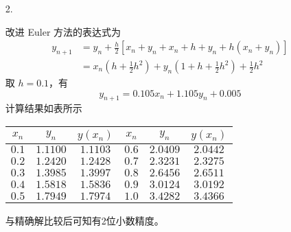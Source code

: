 \documentclass{sjtuarticle}
\begin{document}
\begin{itemize}
    \item[2.] \begin{solution}
        改进 Euler 方法的表达式为
        \begin{equation*}
            \begin{aligned}
            y_{n+1}&=y_n + \frac{h}{2}[x_n+y_n+x_n+h+y_n+h(x_n+y_n)]\\
                    &=x_n\left(h+\frac{1}{2}h^2\right) + y_n\left(1+h+\frac{1}{2}h^2\right) + \frac{1}{2}h^2
            \end{aligned}
        \end{equation*}
        取 $h=0.1$，有
        \begin{equation*}
            y_{n+1}=0.105x_n+1.105y_n+0.005
        \end{equation*}
        计算结果如表所示
        \begin{table}[h]
            \centering
            \begin{tabular}{ccc|ccc}
                \toprule
                $x_n$ & $y_n$ & $y(x_n)$ & $x_n$ & $y_n$ & $y(x_n)$ \\
                \midrule
                $0.1$   & $1.1100$      & $1.1103$  &                 $0.6$   & $2.0409$      & $2.0442$ \\
                $0.2$   & $1.2420$      & $1.2428$  &                 $0.7$   & $2.3231$      & $2.3275$ \\
                $0.3$   & $1.3985$      & $1.3997$  &                 $0.8$   & $2.6456$      & $2.6511$ \\
                $0.4$   & $1.5818$      & $1.5836$  &                 $0.9$   & $3.0124$      & $3.0192$ \\
                $0.5$   & $1.7949$      & $1.7974$  &                 $1.0$   & $3.4282$      & $3.4366$ \\
                \bottomrule
            \end{tabular}
        \end{table}

        与精确解比较后可知有2位小数精度。
    \end{solution}


\end{itemize}
\end{document}
